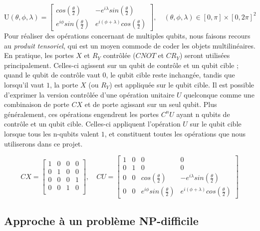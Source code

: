\begin{equation}
\mathrm{U}(\theta, \phi, \lambda) = 
\begin{bmatrix}
cos(\frac{\theta}{2}) & -e^{i\lambda}sin(\frac{\theta}{2}) \\
e^{i\phi}sin(\frac{\theta}{2}) & e^{i(\phi + \lambda)}cos(\frac{\theta}{2})
\end{bmatrix}
, \quad 
(\theta, \phi, \lambda) \in [0,\pi] \times [0, 2\pi]^2
\end{equation}
Pour réaliser des opérations concernant de multiples qubits, nous faisons recours au \textit{produit tensoriel}, qui est un moyen commode de coder les objets multilinéaires. En pratique, les portes $X$ et $R_Y$ contrôlée ($CNOT$ et $CR_Y$) seront utilisées principalement. Celles-ci agissent sur un qubit de contrôle et un qubit cible ; quand le qubit de contrôle vaut \(0\), le qubit cible reste inchangée, tandis que lorsqu’il vaut \(1\), la porte \(X\) (ou $R_Y$) est appliquée sur le qubit cible. Il est possible d’exprimer la version contrôlée d’une opération unitaire \(U\) quelconque comme une combinaison de porte \(CX\) et de porte agissant sur un seul qubit. Plus généralement, ces opérations engendrent les portes 
\(C^nU\)  ayant n qubits de contrôle et un qubit cible. Celles-ci appliquent l’opération \(U\) sur le qubit cible lorsque tous les n-qubits valent \(1\), et constituent toutes les opérations que nous utiliserons dans ce projet.

\begin{equation}
CX = 
\begin{bmatrix}
1&0&0&0\\
0&1&0&0\\
0&0&0&1\\
0&0&1&0\\
\end{bmatrix}
, \quad 
CU = 
\begin{bmatrix}
1&0&0&0\\
0&1&0&0\\
0&0&cos(\frac{\theta}{2}) & -e^{i\lambda}sin(\frac{\theta}{2}) \\
0&0&e^{i\phi}sin(\frac{\theta}{2}) & e^{i(\phi + \lambda)}cos(\frac{\theta}{2})
\end{bmatrix}
\end{equation}


\subsection{Approche à un problème NP-difficile}
\label{QuantRepBN}


